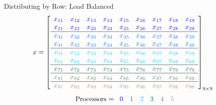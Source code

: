 \begin{frame}
\begin{block}{Distributing by Row: Load Balanced}
\begin{align*}
x &= \left[
      \begin{array}{lllllllll}
      \color{g11}x_{11} & \color{g11}x_{12} & \color{g11}x_{13} & \color{g11}x_{14} & 
\color{g11}x_{15} & \color{g11}x_{16} & \color{g11}x_{17} & \color{g11}x_{18} & \color{g11}x_{19}\\
      \color{g11}x_{21} & \color{g11}x_{22} & \color{g11}x_{23} & \color{g11}x_{24} & 
\color{g11}x_{25} & \color{g11}x_{26} & \color{g11}x_{27} & \color{g11}x_{28} & 
\color{g11}x_{29}\\\hline
      \color{g12}x_{31} & \color{g12}x_{32} & \color{g12}x_{33} & \color{g12}x_{34} & 
\color{g12}x_{35} & \color{g12}x_{36} & \color{g12}x_{37} & \color{g12}x_{38} & \color{g12}x_{39}\\
      \color{g12}x_{41} & \color{g12}x_{42} & \color{g12}x_{43} & \color{g12}x_{44} & 
\color{g12}x_{45} & \color{g12}x_{46} & \color{g12}x_{47} & \color{g12}x_{48} & 
\color{g12}x_{49}\\\hline
      \color{g13}x_{51} & \color{g13}x_{52} & \color{g13}x_{53} & \color{g13}x_{54} & 
\color{g13}x_{55} & \color{g13}x_{56} & \color{g13}x_{57} & \color{g13}x_{58} & \color{g13}x_{59}\\
      \color{g13}x_{61} & \color{g13}x_{62} & \color{g13}x_{63} & \color{g13}x_{64} & 
\color{g13}x_{65} & \color{g13}x_{66} & \color{g13}x_{67} & \color{g13}x_{68} & 
\color{g13}x_{69}\\\hline
      \color{g21}x_{71} & \color{g21}x_{72} & \color{g21}x_{73} & \color{g21}x_{74} & 
\color{g21}x_{75} & \color{g21}x_{76} & \color{g21}x_{77} & \color{g21}x_{78} & 
\color{g21}x_{79}\\\hline
      \color{g22}x_{81} & \color{g22}x_{82} & \color{g22}x_{83} & \color{g22}x_{84} & 
\color{g22}x_{85} & \color{g22}x_{86} & \color{g22}x_{87} & \color{g22}x_{88} & 
\color{g22}x_{89}\\\hline
      \color{g23}x_{91} & \color{g23}x_{92} & \color{g23}x_{93} & \color{g23}x_{94} & 
\color{g23}x_{95} & \color{g23}x_{96} & \color{g23}x_{97} & \color{g23}x_{98} & \color{g23}x_{99}\\
      \end{array}
\right]_{9\times 9}
\end{align*}
\begin{align*}
\text{Processors = }
      \begin{array}{llllll}
      \color{g11}0 & \color{g12}1 & \color{g13}2 & \color{g21}3 & \color{g22}4 & \color{g23}5
      \end{array}
\end{align*}
\end{block}
\end{frame}

